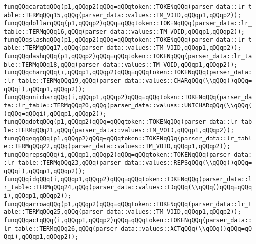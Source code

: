 \verb|funqQQqcaratqQQq(p1,qQQqp2)qQQq=qQQqtoken::TOKENqQQq(parser_data::lr_table::TERMqQQq15,qQQq(parser_data::values::TM_VOID,qQQqp1,qQQqp2));|\newline
\verb|funqQQqdollarqQQq(p1,qQQqp2)qQQq=qQQqtoken::TOKENqQQq(parser_data::lr_table::TERMqQQq16,qQQq(parser_data::values::TM_VOID,qQQqp1,qQQqp2));|\newline
\verb|funqQQqslashqQQq(p1,qQQqp2)qQQq=qQQqtoken::TOKENqQQq(parser_data::lr_table::TERMqQQq17,qQQq(parser_data::values::TM_VOID,qQQqp1,qQQqp2));|\newline
\verb|funqQQqdashqQQq(p1,qQQqp2)qQQq=qQQqtoken::TOKENqQQq(parser_data::lr_table::TERMqQQq18,qQQq(parser_data::values::TM_VOID,qQQqp1,qQQqp2));|\newline
\verb|funqQQqcharqQQq(i,qQQqp1,qQQqp2)qQQq=qQQqtoken::TOKENqQQq(parser_data::lr_table::TERMqQQq19,qQQq(parser_data::values::CHARqQQq(\\qQQq()qQQq=qQQqi),qQQqp1,qQQqp2));|\newline
\verb|funqQQqunicharqQQq(i,qQQqp1,qQQqp2)qQQq=qQQqtoken::TOKENqQQq(parser_data::lr_table::TERMqQQq20,qQQq(parser_data::values::UNICHARqQQq(\\qQQq()qQQq=qQQqi),qQQqp1,qQQqp2));|\newline
\verb|funqQQqdotqQQq(p1,qQQqp2)qQQq=qQQqtoken::TOKENqQQq(parser_data::lr_table::TERMqQQq21,qQQq(parser_data::values::TM_VOID,qQQqp1,qQQqp2));|\newline
\verb|funqQQqeqqQQq(p1,qQQqp2)qQQq=qQQqtoken::TOKENqQQq(parser_data::lr_table::TERMqQQq22,qQQq(parser_data::values::TM_VOID,qQQqp1,qQQqp2));|\newline
\verb|funqQQqrepsqQQq(i,qQQqp1,qQQqp2)qQQq=qQQqtoken::TOKENqQQq(parser_data::lr_table::TERMqQQq23,qQQq(parser_data::values::REPSqQQq(\\qQQq()qQQq=qQQqi),qQQqp1,qQQqp2));|\newline
\verb|funqQQqidqQQq(i,qQQqp1,qQQqp2)qQQq=qQQqtoken::TOKENqQQq(parser_data::lr_table::TERMqQQq24,qQQq(parser_data::values::IDqQQq(\\qQQq()qQQq=qQQqi),qQQqp1,qQQqp2));|\newline
\verb|funqQQqarrowqQQq(p1,qQQqp2)qQQq=qQQqtoken::TOKENqQQq(parser_data::lr_table::TERMqQQq25,qQQq(parser_data::values::TM_VOID,qQQqp1,qQQqp2));|\newline
\verb|funqQQqactqQQq(i,qQQqp1,qQQqp2)qQQq=qQQqtoken::TOKENqQQq(parser_data::lr_table::TERMqQQq26,qQQq(parser_data::values::ACTqQQq(\\qQQq()qQQq=qQQqi),qQQqp1,qQQqp2));|\newline
